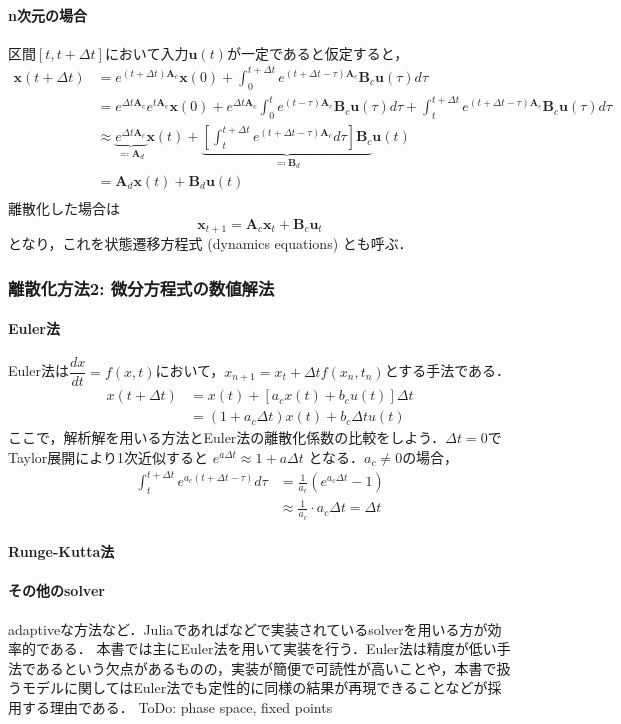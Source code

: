 \paragraph{n次元の場合}
区間$[t, t+\Delta t]$において入力$\mathbf{u}(t)$が一定であると仮定すると，
\begin{align}
\mathbf{x}(t+\Delta t)&=e^{(t+\Delta t)\mathbf{A}_c}\mathbf{x}(0)+\int_0^{t+\Delta t} e^{(t+\Delta t-\tau)\mathbf{A}_c}\mathbf{B}_c\mathbf{u}(\tau) d\tau\\
&=e^{\Delta t\mathbf{A}_c}e^{t\mathbf{A}_c}\mathbf{x}(0)+e^{\Delta t\mathbf{A}_c}\int_0^{t} e^{(t-\tau)\mathbf{A}_c}\mathbf{B}_c\mathbf{u}(\tau) d\tau + \int_t^{t+\Delta t} e^{(t+\Delta t-\tau)\mathbf{A}_c}\mathbf{B}_c\mathbf{u}(\tau) d\tau\\
&\approx \underbrace{e^{\Delta t\mathbf{A}_c}}_{\eqqcolon \mathbf{A}_d}\mathbf{x}(t)+\underbrace{\left[\int_t^{t+\Delta t} e^{(t+\Delta t-\tau)\mathbf{A}_c} d\tau\right] \mathbf{B}_c}_{\eqqcolon \mathbf{B}_d}\mathbf{u}(t)\\
&=\mathbf{A}_d\mathbf{x}(t)+\mathbf{B}_d\mathbf{u}(t)\\
\end{align}
離散化した場合は
\begin{equation}
\mathbf{x}_{t+1} = \mathbf{A}_c\mathbf{x}_t + \mathbf{B}_c\mathbf{u}_t
\end{equation}
となり，これを状態遷移方程式 (dynamics equations) とも呼ぶ．
\subsubsection{離散化方法2: 微分方程式の数値解法}
\paragraph{Euler法}
Euler法は$\dfrac{dx}{dt}=f(x, t)$において，$x_{n+1}=x_t+\Delta t f(x_n, t_n)$とする手法である．
\begin{align}
x(t+\Delta t)&=x(t) + \left[a_c x(t)+b_c u(t) \right]\Delta t\\
&=(1+a_c \Delta t)x(t) + b_c\Delta t u(t)
\end{align}
ここで，解析解を用いる方法とEuler法の離散化係数の比較をしよう．$\Delta t=0$でTaylor展開により1次近似すると $e^{a \Delta t} \approx 1 + a\Delta t$ となる．$a_c\neq 0$の場合，
\begin{align}
\int_t^{t+\Delta t} e^{a_c(t+\Delta t-\tau)} d\tau&=\frac{1}{a_c}(e^{a_c \Delta t}-1)\\
&\approx \frac{1}{a_c}\cdot a_c \Delta t=\Delta t
\end{align}
\paragraph{Runge-Kutta法}
\paragraph{その他のsolver}
adaptiveな方法など．Juliaであればなどで実装されているsolverを用いる方が効率的である．
本書では主にEuler法を用いて実装を行う．Euler法は精度が低い手法であるという欠点があるものの，実装が簡便で可読性が高いことや，本書で扱うモデルに関してはEuler法でも定性的に同様の結果が再現できることなどが採用する理由である．
ToDo: phase space, fixed points
